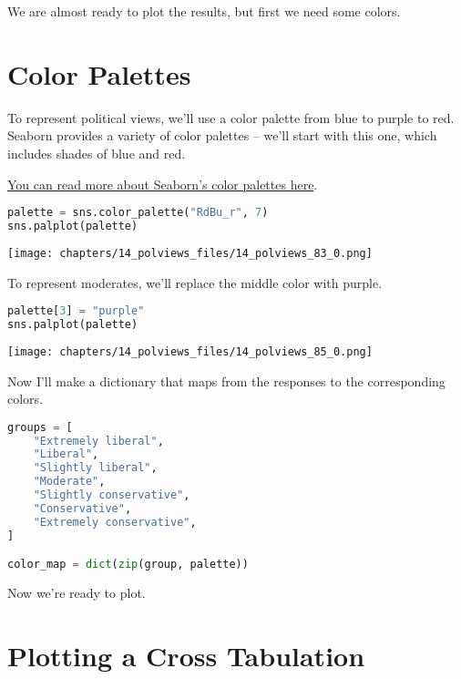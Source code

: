 We are almost ready to plot the results, but first we need some colors.

\hypertarget{color-palettes}{%
\section{Color Palettes}\label{color-palettes}}

To represent political views, we'll use a color palette from blue to
purple to red. Seaborn provides a variety of color palettes -- we'll
start with this one, which includes shades of blue and red.

\href{https://seaborn.pydata.org/tutorial/color_palettes.html}{You can
read more about Seaborn's color palettes here}.

\begin{lstlisting}[language=Python,style=source]
palette = sns.color_palette("RdBu_r", 7)
sns.palplot(palette)
\end{lstlisting}

\begin{center}
\texttt{[image: chapters/14\_polviews\_files/14\_polviews\_83\_0.png]}
\end{center}

To represent moderates, we'll replace the middle color with purple.

\begin{lstlisting}[language=Python,style=source]
palette[3] = "purple"
sns.palplot(palette)
\end{lstlisting}

\begin{center}
\texttt{[image: chapters/14\_polviews\_files/14\_polviews\_85\_0.png]}
\end{center}

Now I'll make a dictionary that maps from the responses to the
corresponding colors.

\begin{lstlisting}[language=Python,style=source]
groups = [
    "Extremely liberal",
    "Liberal",
    "Slightly liberal",
    "Moderate",
    "Slightly conservative",
    "Conservative",
    "Extremely conservative",
]

color_map = dict(zip(group, palette))
\end{lstlisting}

Now we're ready to plot.

\hypertarget{plotting-a-cross-tabulation}{%
\section{Plotting a Cross
Tabulation}\label{plotting-a-cross-tabulation}}

